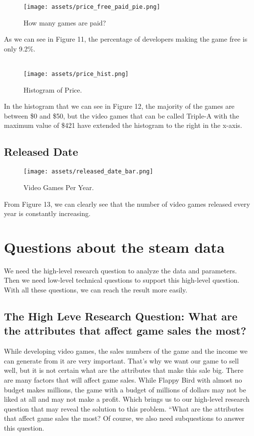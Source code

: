 \documentclass[conference]{IEEEtran}
\begin{document}
\begin{figure}[h]
  \texttt{[image: assets/price\_free\_paid\_pie.png]}
  \caption{How many games are paid?}
  \label{fig:price1}
\end{figure}

As we can see in Figure 11, the percentage of developers making the game free is only 9.2\%. \\\\

\begin{figure}[h]
  \texttt{[image: assets/price\_hist.png]}
  \caption{Histogram of Price.}
  \label{fig:price2}
\end{figure}

In the histogram that we can see in Figure 12, the majority of the games are between \$0 and \$50, but the video games that can be called Triple-A with the maximum value of \$421 have extended the histogram to the right in the x-axis.

\subsection{Released Date}


\begin{figure}[h]
  \texttt{[image: assets/released\_date\_bar.png]}
  \caption{Video Games Per Year.}
  \label{fig:releaseddate1}
\end{figure}

From Figure 13, we can clearly see that the number of video games released every year is constantly increasing.

\section{Questions about the steam data}
We need the high-level research question to analyze the data and parameters. Then we need low-level technical questions to support this high-level question. With all these questions, we can reach the result more easily.

\subsection{The High Leve Research Question: What are the attributes that affect game sales the most?}\label{AA}
While developing video games, the sales numbers of the game and the income we can generate from it are very important. That's why we want our game to sell well, but it is not certain what are the attributes that make this sale big. There are many factors that will affect game sales. While Flappy Bird with almost no budget makes millions, the game with a budget of millions of dollars may not be liked at all and may not make a profit. Which brings us to our high-level research question that may reveal the solution to this problem. “What are the attributes that affect game sales the most? Of course, we also need subquestions to answer this question.
\end{document}
